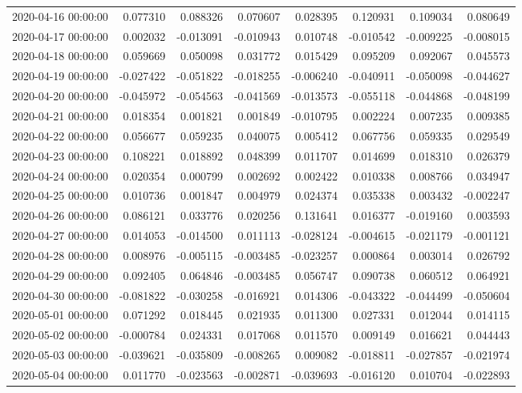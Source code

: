 \begin{tabular}{lrrrrrrr}
2020-04-16 00:00:00 & 0.077310 & 0.088326 & 0.070607 & 0.028395 & 0.120931 & 0.109034 & 0.080649 \\
2020-04-17 00:00:00 & 0.002032 & -0.013091 & -0.010943 & 0.010748 & -0.010542 & -0.009225 & -0.008015 \\
2020-04-18 00:00:00 & 0.059669 & 0.050098 & 0.031772 & 0.015429 & 0.095209 & 0.092067 & 0.045573 \\
2020-04-19 00:00:00 & -0.027422 & -0.051822 & -0.018255 & -0.006240 & -0.040911 & -0.050098 & -0.044627 \\
2020-04-20 00:00:00 & -0.045972 & -0.054563 & -0.041569 & -0.013573 & -0.055118 & -0.044868 & -0.048199 \\
2020-04-21 00:00:00 & 0.018354 & 0.001821 & 0.001849 & -0.010795 & 0.002224 & 0.007235 & 0.009385 \\
2020-04-22 00:00:00 & 0.056677 & 0.059235 & 0.040075 & 0.005412 & 0.067756 & 0.059335 & 0.029549 \\
2020-04-23 00:00:00 & 0.108221 & 0.018892 & 0.048399 & 0.011707 & 0.014699 & 0.018310 & 0.026379 \\
2020-04-24 00:00:00 & 0.020354 & 0.000799 & 0.002692 & 0.002422 & 0.010338 & 0.008766 & 0.034947 \\
2020-04-25 00:00:00 & 0.010736 & 0.001847 & 0.004979 & 0.024374 & 0.035338 & 0.003432 & -0.002247 \\
2020-04-26 00:00:00 & 0.086121 & 0.033776 & 0.020256 & 0.131641 & 0.016377 & -0.019160 & 0.003593 \\
2020-04-27 00:00:00 & 0.014053 & -0.014500 & 0.011113 & -0.028124 & -0.004615 & -0.021179 & -0.001121 \\
2020-04-28 00:00:00 & 0.008976 & -0.005115 & -0.003485 & -0.023257 & 0.000864 & 0.003014 & 0.026792 \\
2020-04-29 00:00:00 & 0.092405 & 0.064846 & -0.003485 & 0.056747 & 0.090738 & 0.060512 & 0.064921 \\
2020-04-30 00:00:00 & -0.081822 & -0.030258 & -0.016921 & 0.014306 & -0.043322 & -0.044499 & -0.050604 \\
2020-05-01 00:00:00 & 0.071292 & 0.018445 & 0.021935 & 0.011300 & 0.027331 & 0.012044 & 0.014115 \\
2020-05-02 00:00:00 & -0.000784 & 0.024331 & 0.017068 & 0.011570 & 0.009149 & 0.016621 & 0.044443 \\
2020-05-03 00:00:00 & -0.039621 & -0.035809 & -0.008265 & 0.009082 & -0.018811 & -0.027857 & -0.021974 \\
2020-05-04 00:00:00 & 0.011770 & -0.023563 & -0.002871 & -0.039693 & -0.016120 & 0.010704 & -0.022893 \\

\end{tabular}
